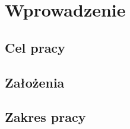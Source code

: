 \chapter{Wprowadzenie}
\label{t:wprowadzenie}
		
	\section{Cel pracy}
	\label{t:wprowadzenie:cel}
	
	
	\section{Założenia}
	\label{t:wprowadzenie:zalozenia}
	
	
	\section{Zakres pracy}
	\label{t:wprowadzenie:zakres}
	